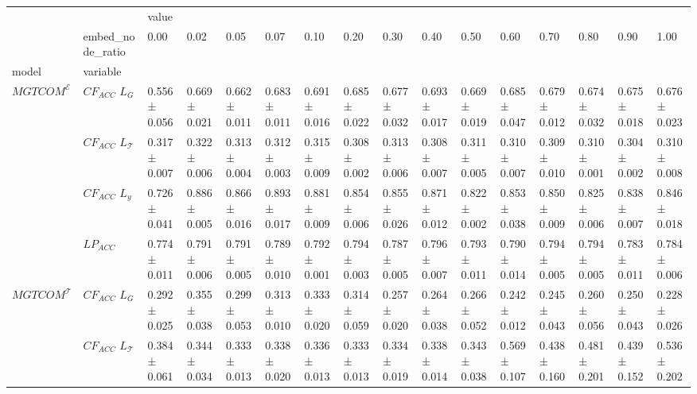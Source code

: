 \begin{tabular}{llllllllllllllll}
\toprule
                       & {} & \multicolumn{14}{l}{value} \\
                       & embed_node_ratio &           0.00 &           0.02 &           0.05 &           0.07 &           0.10 &           0.20 &           0.30 &           0.40 &           0.50 &           0.60 &           0.70 &           0.80 &           0.90 &           1.00 \\
model & variable &                &                &                &                &                &                &                &                &                &                &                &                &                &                \\
\midrule
$MGTCOM^{\mathcal{E}}$ & $CF_{ACC}$ $L_G$ &  0.556 ± 0.056 &  0.669 ± 0.021 &  0.662 ± 0.011 &  0.683 ± 0.011 &  0.691 ± 0.016 &  0.685 ± 0.022 &  0.677 ± 0.032 &  0.693 ± 0.017 &  0.669 ± 0.019 &  0.685 ± 0.047 &  0.679 ± 0.012 &  0.674 ± 0.032 &  0.675 ± 0.018 &  0.676 ± 0.023 \\
                       & $CF_{ACC}$ $L_\mathcal{T}$ &  0.317 ± 0.007 &  0.322 ± 0.006 &  0.313 ± 0.004 &  0.312 ± 0.003 &  0.315 ± 0.009 &  0.308 ± 0.002 &  0.313 ± 0.006 &  0.308 ± 0.007 &  0.311 ± 0.005 &  0.310 ± 0.007 &  0.309 ± 0.010 &  0.310 ± 0.001 &  0.304 ± 0.002 &  0.310 ± 0.008 \\
                       & $CF_{ACC}$ $L_y$ &  0.726 ± 0.041 &  0.886 ± 0.005 &  0.866 ± 0.016 &  0.893 ± 0.017 &  0.881 ± 0.009 &  0.854 ± 0.006 &  0.855 ± 0.026 &  0.871 ± 0.012 &  0.822 ± 0.002 &  0.853 ± 0.038 &  0.850 ± 0.009 &  0.825 ± 0.006 &  0.838 ± 0.007 &  0.846 ± 0.018 \\
                       & $LP_{ACC}$ &  0.774 ± 0.011 &  0.791 ± 0.006 &  0.791 ± 0.005 &  0.789 ± 0.010 &  0.792 ± 0.001 &  0.794 ± 0.003 &  0.787 ± 0.005 &  0.796 ± 0.007 &  0.793 ± 0.011 &  0.790 ± 0.014 &  0.794 ± 0.005 &  0.794 ± 0.005 &  0.783 ± 0.011 &  0.784 ± 0.006 \\
$MGTCOM^{\mathcal{T}}$ & $CF_{ACC}$ $L_G$ &  0.292 ± 0.025 &  0.355 ± 0.038 &  0.299 ± 0.053 &  0.313 ± 0.010 &  0.333 ± 0.020 &  0.314 ± 0.059 &  0.257 ± 0.020 &  0.264 ± 0.038 &  0.266 ± 0.052 &  0.242 ± 0.012 &  0.245 ± 0.043 &  0.260 ± 0.056 &  0.250 ± 0.043 &  0.228 ± 0.026 \\
                       & $CF_{ACC}$ $L_\mathcal{T}$ &  0.384 ± 0.061 &  0.344 ± 0.034 &  0.333 ± 0.013 &  0.338 ± 0.020 &  0.336 ± 0.013 &  0.333 ± 0.013 &  0.334 ± 0.019 &  0.338 ± 0.014 &  0.343 ± 0.038 &  0.569 ± 0.107 &  0.438 ± 0.160 &  0.481 ± 0.201 &  0.439 ± 0.152 &  0.536 ± 0.202 \\

\end{tabular}
